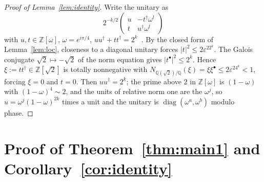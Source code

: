 \documentclass[aps,prx,twocolumn,superscriptaddress,nofootinbib,longbibliography]{revtex4-2}
\theoremstyle{plain}
\theoremstyle{definition}
\theoremstyle{remark}
\newcommand{\Z}{\mathbb{Z}}
\newcommand{\Q}{\mathbb{Q}}
\begin{document}
\begin{proof}[Proof of Lemma~\ref{lem:identity}]
Write the unitary as
\[2^{-k/2}\begin{pmatrix}u&-t^\dagger\omega^l\\ t&u^\dagger\omega^l\end{pmatrix}\]
with $u,t\in\Z[\omega]$, $\omega=e^{i\pi/4}$, $uu^\dagger+tt^\dagger=2^k$~\cite{KMM13}. By the closed form of Lemma~\ref{lem:loc}, closeness to a diagonal unitary forces $|t|^2\le2\varepsilon^22^k$. The Galois conjugate $\sqrt2\mapsto-\sqrt2$ of the norm equation gives $|t^\bullet|^2\le2^k$. Hence $\xi:=tt^\dagger\in\Z[\sqrt2]$ is totally nonnegative with $N_{\Q(\sqrt2)/\Q}(\xi)=\xi\xi^\bullet\le2\varepsilon^24^k<1$, forcing $\xi=0$ and $t=0$. Then $uu^\dagger=2^k$; the prime above $2$ in $\Z[\omega]$ is $(1-\omega)$ with $(1-\omega)^4\sim2$, and the units of relative norm one are the $\omega^j$, so $u=\omega^j(1-\omega)^{2k}$ times a unit and the unitary is $\operatorname{diag}(\omega^a,\omega^b)$ modulo phase.
\end{proof}

\section{Proof of Theorem~\ref{thm:main1} and Corollary~\ref{cor:identity}}\label{app:main1}
\end{document}
